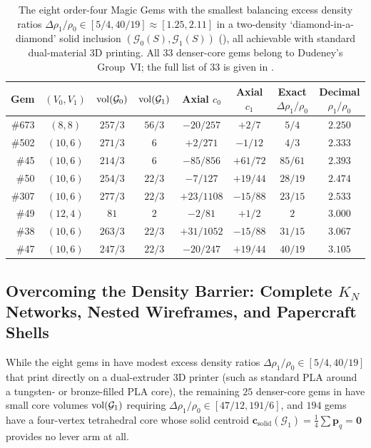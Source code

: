 \begin{table}[htbp]
\centering
\caption{The eight order-four Magic Gems with the smallest balancing excess density ratios $\Delta\rho_1/\rho_0\in[5/4,40/19]\approx[1.25,2.11]$ in a two-density `diamond-in-a-diamond' solid inclusion $(\mathcal G_0(S),\mathcal G_1(S))$ (), all achievable with standard dual-material 3D printing. All $33$ denser-core gems belong to Dudeney's Group~VI; the full list of $33$ is given in .}
\label{tab:two-density}
\small
\setlength{\tabcolsep}{5.0pt}
\begin{tabular}{r c c c c c c c}
\toprule
Gem & $(V_0,V_1)$ & $\operatorname{vol}(\mathcal G_0)$ & $\operatorname{vol}(\mathcal G_1)$ & Axial $c_0$ & Axial $c_1$ & Exact $\Delta\rho_1/\rho_0$ & Decimal $\rho_1/\rho_0$\\
\midrule
\#673 & $(8,8)$  & $257/3$ & $56/3$ & $-20/257$  & $+2/7$    & $5/4$   & $2.250$\\
\#502 & $(10,6)$ & $271/3$ & $6$    & $+2/271$   & $-1/12$   & $4/3$   & $2.333$\\
\#45  & $(10,6)$ & $214/3$ & $6$    & $-85/856$  & $+61/72$  & $85/61$ & $2.393$\\
\#50  & $(10,6)$ & $254/3$ & $22/3$ & $-7/127$   & $+19/44$  & $28/19$ & $2.474$\\
\#307 & $(10,6)$ & $277/3$ & $22/3$ & $+23/1108$ & $-15/88$  & $23/15$ & $2.533$\\
\#49  & $(12,4)$ & $81$    & $2$    & $-2/81$    & $+1/2$    & $2$     & $3.000$\\
\#38  & $(10,6)$ & $263/3$ & $22/3$ & $+31/1052$ & $-15/88$  & $31/15$ & $3.067$\\
\#47  & $(10,6)$ & $247/3$ & $22/3$ & $-20/247$  & $+19/44$  & $40/19$ & $3.105$\\
\bottomrule
\end{tabular}
\end{table}

\subsection{Overcoming the Density Barrier: Complete \texorpdfstring{$K_N$}{K\_N} Networks, Nested Wireframes, and Papercraft Shells}
\label{subsec:wireframes-nets}

While the eight gems in  have modest excess density ratios $\Delta\rho_1/\rho_0\in[5/4,40/19]$ that print directly on a dual-extruder 3D printer (such as standard PLA around a tungsten- or bronze-filled PLA core), the remaining $25$ denser-core gems in  have small core volumes $\operatorname{vol}(\mathcal G_1)$ requiring $\Delta\rho_1/\rho_0\in[47/12,191/6]$, and $194$ gems have a four-vertex tetrahedral core whose solid centroid $\mathbf c_{\mathrm{solid}}(\mathcal G_1)=\frac14\sum\mathbf p_q=\mathbf 0$ provides no lever arm at all.

